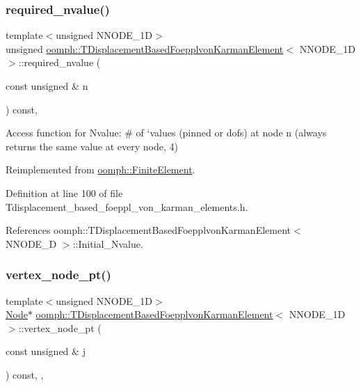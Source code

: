 \subsubsection{\texorpdfstring{required\+\_\+nvalue()}{required\_nvalue()}}
{\footnotesize\ttfamily template$<$unsigned N\+N\+O\+D\+E\+\_\+1D$>$ \\
unsigned \hyperlink{classoomph_1_1TDisplacementBasedFoepplvonKarmanElement}{oomph\+::\+T\+Displacement\+Based\+Foepplvon\+Karman\+Element}$<$ N\+N\+O\+D\+E\+\_\+1D $>$\+::required\+\_\+nvalue (\begin{DoxyParamCaption}\item[{const unsigned \&}]{n }\end{DoxyParamCaption}) const\hspace{0.3cm}{\ttfamily [inline]}, {\ttfamily [virtual]}}



Access function for Nvalue\+: \# of `values\textquotesingle{} (pinned or dofs) at node n (always returns the same value at every node, 4) 



Reimplemented from \hyperlink{classoomph_1_1FiniteElement_a56610c60d5bc2d7c27407a1455471b1a}{oomph\+::\+Finite\+Element}.



Definition at line 100 of file Tdisplacement\+\_\+based\+\_\+foeppl\+\_\+von\+\_\+karman\+\_\+elements.\+h.



References oomph\+::\+T\+Displacement\+Based\+Foepplvon\+Karman\+Element$<$ N\+N\+O\+D\+E\+\_\+D $>$\+::\+Initial\+\_\+\+Nvalue.

\mbox{\label{classoomph_1_1TDisplacementBasedFoepplvonKarmanElement_abc04483e26179e84bc8bc0034a533a74}} 
\subsubsection{\texorpdfstring{vertex\+\_\+node\+\_\+pt()}{vertex\_node\_pt()}}
{\footnotesize\ttfamily template$<$unsigned N\+N\+O\+D\+E\+\_\+1D$>$ \\
\hyperlink{classoomph_1_1Node}{Node}$\ast$ \hyperlink{classoomph_1_1TDisplacementBasedFoepplvonKarmanElement}{oomph\+::\+T\+Displacement\+Based\+Foepplvon\+Karman\+Element}$<$ N\+N\+O\+D\+E\+\_\+1D $>$\+::vertex\+\_\+node\+\_\+pt (\begin{DoxyParamCaption}\item[{const unsigned \&}]{j }\end{DoxyParamCaption}) const\hspace{0.3cm}{\ttfamily [inline]}, {\ttfamily [protected]}, {\ttfamily [virtual]}}



